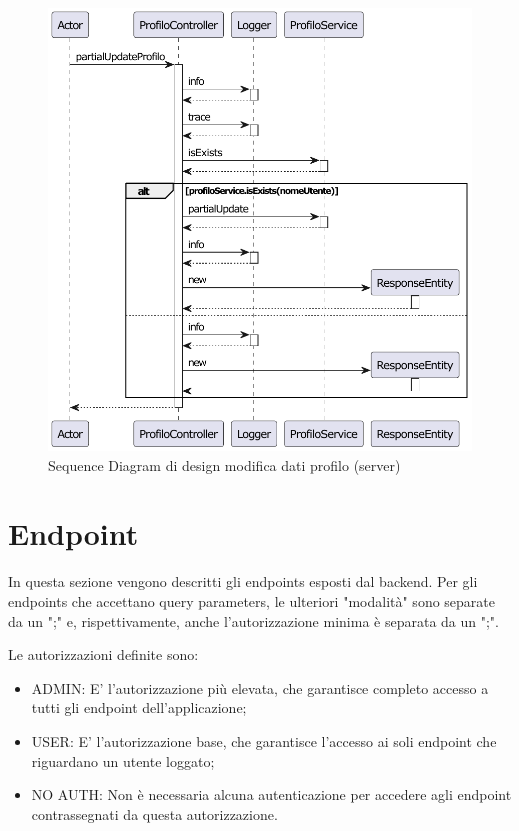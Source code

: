             \begin{figure}[htbp!]
                \centering
                    \includegraphics[width=1\linewidth]{Immagini/Diagrammi/Sequence Diagram/Design/Server Sequence Design/ServerSequenceModificaProfiloDesign.pdf}
                \caption{Sequence Diagram di design modifica dati profilo (server)}
                \label{fig:Sequence Diagram di design modifica dati profilo (server)}
            \end{figure}
    
    \clearpage

    \section{Endpoint}
        In questa sezione vengono descritti gli endpoints esposti dal backend. Per gli endpoints che accettano query parameters, le ulteriori "modalità" sono separate da un ";" e, rispettivamente, anche l'autorizzazione minima è separata da un ";".

        Le autorizzazioni definite sono:
        \begin{itemize}
            \item ADMIN: E' l'autorizzazione più elevata, che garantisce completo accesso a tutti gli endpoint dell'applicazione;
            \item USER: E' l'autorizzazione base, che garantisce l'accesso ai soli endpoint che riguardano un utente loggato;
            \item NO AUTH: Non è necessaria alcuna autenticazione per accedere agli endpoint contrassegnati da questa autorizzazione.
        \end{itemize}

